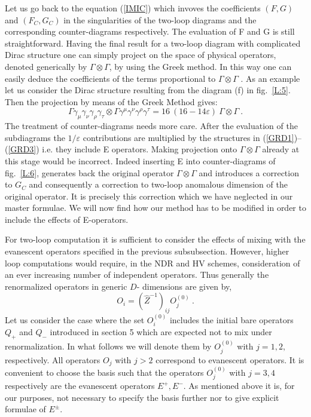 \documentclass[12pt]{article}
\newcommand{\be}{\begin{equation}}
\newcommand{\ee}{\end{equation}}
\begin{document}
\begin{itemize}
\begin{itemize}
Let us go back to the equation (\ref{IMIC}) which invoves the coefficients
$(F,G)$ and $(F_C,G_C)$ in the singularities of the two-loop
diagrams and the corresponding counter-diagrams respectively.
The evaluation of F and G  is still 
straightforward. Having the final result for a two-loop
diagram with complicated Dirac  structure one 
can simply project on the space of physical operators, denoted
generically by $\Gamma\otimes\Gamma$,
by using the Greek method. 
In this way one can easily deduce the coefficients of the terms 
proportional to  
$\Gamma\otimes\Gamma$ . As an example let us consider
the Dirac structure resulting from the diagram (f) in
fig.~\ref{L:5}. Then
the projection by means of the Greek Method gives:
\be\label{GRTW}
\Gamma\gamma_\mu\gamma_\nu\gamma_\rho\gamma_\tau\otimes\Gamma
\gamma^\mu\gamma^\nu\gamma^\rho\gamma^\tau=
16~(16-14\varepsilon)~\Gamma\otimes\Gamma~.
\ee
The treatment of counter-diagrams needs more care. After the evaluation
 of the subdiagrams the $1/\varepsilon$ contributions are multiplied
by the structures in (\ref{GRD1})--(\ref{GRD3}) 
i.e. they 
include E operators. Making projection onto $\Gamma\otimes\Gamma$ 
 already at this stage would be 
incorrect. Indeed inserting E into  counter-diagrams of
 fig.~\ref{L:6}, generates  back the 
original operator $\Gamma\otimes\Gamma$ and introduces a correction 
to $G_C$ and consequently a correction
to two-loop  anomalous dimension 
of the original operator. It is precisely this correction which
 we have neglected in our master formulae. We will now find how
 our method has to be modified in order to include the effects
 of E-operators.

 For two-loop computation it is sufficient to consider the effects
 of mixing with the evanescent operators   specified
 in the previous subsubsection.
  However, higher loop computations would require,
 in the NDR and HV schemes, consideration of
 an ever increasing number of independent
 operators. Thus generally
 the renormalized operators in generic
 $D$- dimensions are given by,
\be
 O_{i} = (\hat Z^{-1})_{i j} O^{(0)}_{j}~.
\ee
Let us consider the case where the set $O^{(0)}_{i}$ includes the initial 
bare operators $Q_+$ and $Q_-$ introduced in section 5 which are expected
not to mix under renormalization. In what follows we will denote them by
$O^{(0)}_{j}$ with  $j=1,2,$ respectively. All operators $O_{j}$  
with $j>2$  correspond to evanescent operators. It is convenient
 to choose the basis such that the operators
 $O^{(0)}_{j}$ with $j=3,4$ respectively are the
 evanescent operators $E^{+},E^{-}$. As mentioned above it is, for
 our purposes, not necessary to specify the basis further nor to
give explicit formulae of $E^\pm$.
 

\end{itemize}
\end{itemize}
\end{document}
